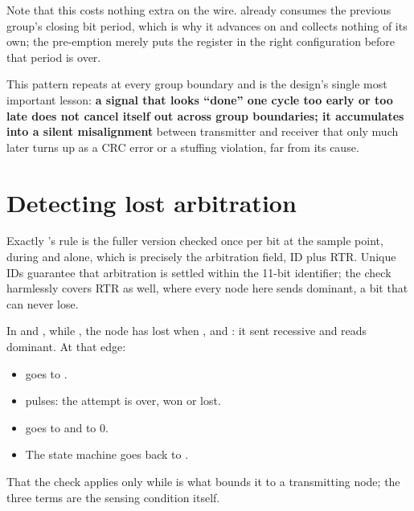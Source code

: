 Note that this costs nothing extra on the wire.  already consumes the previous
group's closing bit period, which is why it advances on  and collects nothing of its
own; the pre-emption merely puts the register in the right configuration before that period is over.

\begin{warning}
This pattern repeats at every group boundary and is the design's single most important lesson: \textbf{a
signal that looks ``done'' one cycle too early or too late does not cancel itself out across group
boundaries; it accumulates into a silent misalignment} between transmitter and receiver that only much
later turns up as a CRC error or a stuffing violation, far from its cause.
\end{warning}

\section{Detecting lost arbitration}
\label{c17:sec:arbitration}

Exactly 's rule \textemdash{}  is the fuller version
\textemdash{} checked once per bit at the sample point, during  and
 alone, which is precisely the arbitration field, ID plus RTR. Unique IDs guarantee
that arbitration is settled within the 11-bit identifier; the check harmlessly covers RTR as well,
where every node here sends dominant, a bit that can never lose.

In  and , while , the node has lost when
,  and : it sent recessive and
reads dominant. At that edge:
\begin{itemize}
  \item {} goes to .
  \item {} pulses: the attempt is over, won or lost.
  \item {} goes to  and  to 0.
  \item The state machine goes back to .
\end{itemize}

That the check applies only while  is what bounds it to a transmitting node; the
three terms are the sensing condition itself.

